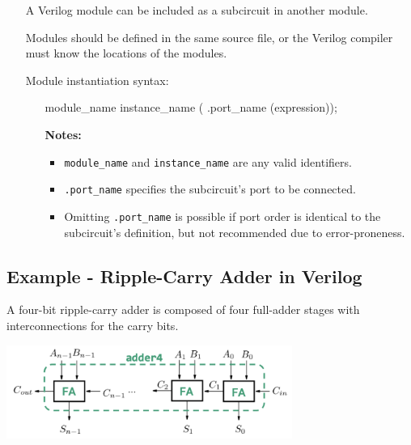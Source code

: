 \documentclass[12pt,openany, tikz,border=10pt]{book}
\begin{document}
			      	\begin{itemize}
			      		\item[] A Verilog module can be included as a subcircuit in another module.
			      		\item[] Modules should be defined in the same source file, or the Verilog compiler must know the locations of the modules.
			      		\item[] Module instantiation syntax:
			      		      \begin{itemize}
			      		      	\item[] \begin{vhdl}
{module\_name instance\_name ( .port\_name (expression));}
			      		      	\end{vhdl}
			      		      	\item[\textbf{Notes:}]
			      		      	      \begin{itemize}
			      		      	      	\item \texttt{module\_name} and \texttt{instance\_name} are any valid identifiers.
			      		      	      	\item \texttt{.port\_name} specifies the subcircuit's port to be connected.
			      		      	      	\item Omitting \texttt{.port\_name} is possible if port order is identical to the subcircuit's definition, but not recommended due to error-proneness.
			      		      	      \end{itemize}
			      		      \end{itemize}
			      	\end{itemize}
			      	
			      	\subsection{Example - Ripple-Carry Adder in Verilog}
			      	A four-bit ripple-carry adder is composed of four full-adder stages with interconnections for the carry bits.
			      	
			      	
			      	\begin{center}
			      		\includegraphics[width=0.70\textwidth]{circuits/10.2.4_2.png}
			      	\end{center}
			      	
\end{document}
